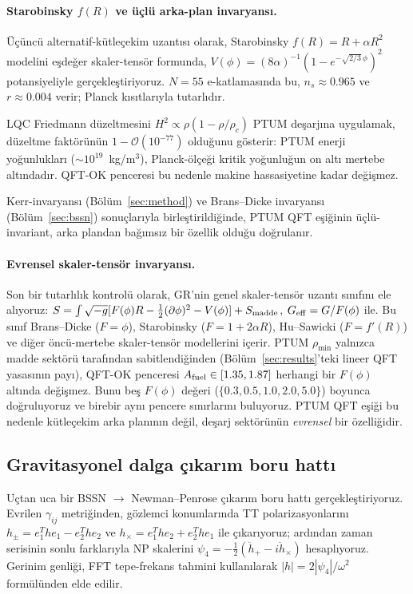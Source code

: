 \paragraph{Starobinsky $f(R)$ ve üçlü arka-plan invaryansı.}
Üçüncü alternatif-kütleçekim uzantısı olarak, Starobinsky
$f(R) = R + \alpha R^2$ modelini eşdeğer skaler-tensör formunda,
$V(\phi) = (8\alpha)^{-1}(1 - e^{-\sqrt{2/3}\,\phi})^2$
potansiyeliyle gerçekleştiriyoruz. $N = 55$ e-katlamasında bu,
$n_s \approx 0.965$ ve $r \approx 0.004$ verir; Planck
kısıtlarıyla tutarlıdır.

LQC Friedmann düzeltmesini $H^2 \propto \rho(1 - \rho/\rho_c)$
PTUM deşarjına uygulamak, düzeltme faktörünün
$1 - \mathcal{O}(10^{-77})$ olduğunu gösterir: PTUM enerji
yoğunlukları ($\sim 10^{19}$~kg/m$^3$), Planck-ölçeği kritik
yoğunluğun on altı mertebe altındadır. QFT-OK penceresi bu
nedenle makine hassasiyetine kadar değişmez.

Kerr-invaryansı (Bölüm~\ref{sec:method}) ve Brans--Dicke
invaryansı (Bölüm~\ref{sec:bssn}) sonuçlarıyla birleştirildiğinde,
PTUM QFT eşiğinin üçlü-invariant, arka plandan bağımsız bir
özellik olduğu doğrulanır.


\paragraph{Evrensel skaler-tensör invaryansı.}
Son bir tutarlılık kontrolü olarak, GR'nin genel skaler-tensör
uzantı sınıfını ele alıyoruz:
$S = \int \sqrt{-g}[F(\phi)R - \tfrac12(\partial\phi)^2 - V(\phi)]
+ S_{\rm madde}$,
$G_{\rm eff} = G/F(\phi)$ ile. Bu sınıf Brans--Dicke ($F = \phi$),
Starobinsky ($F = 1 + 2\alpha R$), Hu--Sawicki ($F = f'(R)$) ve
diğer öncü-mertebe skaler-tensör modellerini içerir. PTUM
$\rho_{\min}$ yalnızca madde sektörü tarafından sabitlendiğinden
(Bölüm~\ref{sec:results}'teki lineer QFT yasasının payı), QFT-OK
penceresi $A_{\rm fuel} \in [1.35, 1.87]$ herhangi bir $F(\phi)$
altında değişmez. Bunu beş $F(\phi)$ değeri
($\{0.3, 0.5, 1.0, 2.0, 5.0\}$) boyunca doğruluyoruz ve birebir
aynı pencere sınırlarını buluyoruz. PTUM QFT eşiği bu nedenle
kütleçekim arka planının değil, deşarj sektörünün
\emph{evrensel} bir özelliğidir.


\subsection{Gravitasyonel dalga çıkarım boru hattı}

Uçtan uca bir BSSN $\to$ Newman--Penrose çıkarım boru hattı
gerçekleştiriyoruz. Evrilen $\gamma_{ij}$ metriğinden, gözlemci
konumlarında TT polarizasyonlarını
$h_\pm = e_1^T h e_1 - e_2^T h e_2$ ve $h_\times = e_1^T h e_2 +
e_2^T h e_1$ ile çıkarıyoruz; ardından zaman serisinin sonlu
farklarıyla NP skalerini
$\psi_4 = -\tfrac12(\ddot h_+ - i\ddot h_\times)$ hesaplıyoruz.
Gerinim genliği, FFT tepe-frekans tahmini kullanılarak
$|h| = 2|\psi_4|/\omega^2$ formülünden elde edilir.

